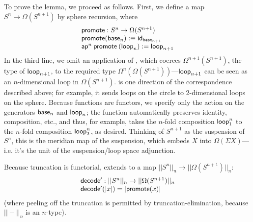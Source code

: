 To prove the lemma, we proceed as follows.  First, we define a map $S^n \to
\Omega(S^{n+1})$ by sphere recursion, where 
\[
\begin{array}{l}
\mathsf{promote} : S^n \to \Omega(S^{n+1}) \\
\mathsf{promote}(\mathsf{base}_n) :\equiv \mathsf{id}_{\mathsf{base}_{n+1}} \\
\mathsf{ap}^n \: \mathsf{promote} \: (\mathsf{loop}_n) := \mathsf{loop}_{n+1}
\end{array}
\]
In the third line, we omit an application of , which coerces $\Omega^{n+1}(S^{n+1})$, the type
of $\mathsf{loop}_{n+1}$, to the required type
$\Omega^n(\Omega(S^{n+1}))$---$\mathsf{loop}_{n+1}$ can be seen
as an $n$-dimensional loop in $\Omega(S^{n+1})$.
 is one direction of the correspondence described above;
for example, it sends loops on the circle to 2-dimensional loops on the
sphere.  Because functions are functors, we specify only the action on
the generators $\mathsf{base}_n$ and $\mathsf{loop}_n$; the function automatically
preserves identity, composition, etc., and thus, for example, takes the $n$-fold
composition $\mathsf{loop}_1^n$ to the $n$-fold composition
$\mathsf{loop}_2^n$, as desired.  Thinking of $S^{n+1}$ as the
suspension of $S^n$, this is the meridian map of the
suspension, which embeds $X$ into $\Omega(\Sigma X)$---i.e. it's the unit of
the suspension/loop space adjunction.

Because truncation is functorial,  extends to a map $||S^n||_n
\to ||\Omega(S^{n+1})||_n$:
\[
\begin{array}{l}
\mathsf{decode'} : ||S^n||_n \to ||\Omega(S^{n+1})||_n \\
\mathsf{decode'}(|x|) = |\mathsf{promote}(x)|
\end{array}
\]
(where peeling off the truncation is permitted by
truncation-elimination, because $||-||_n$ is an $n$-type).

